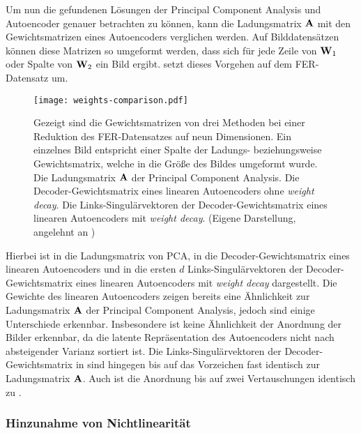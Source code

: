 Um nun die gefundenen Lösungen der Principal Component Analysis und Autoencoder genauer betrachten
zu können, kann die Ladungsmatrix $\mathbf{A}$ mit den Gewichtsmatrizen eines Autoencoders verglichen
werden. Auf Bilddatensätzen können diese Matrizen so umgeformt werden, dass sich für jede Zeile von
$\mathbf{W}_1$ oder Spalte von $\mathbf{W}_2$ ein Bild ergibt.  setzt
dieses Vorgehen auf dem FER-Datensatz um.
\begin{figure}[ht]
	\centering
	\texttt{[image: weights-comparison.pdf]}
	\caption[Die Gewichtsmatrizen von drei Methoden auf dem FER-Datensatz]{Gezeigt sind die Gewichtsmatrizen von drei Methoden bei einer Reduktion des FER-Datensatzes auf neun Dimensionen. Ein einzelnes Bild entspricht einer Spalte der Ladungs- beziehungsweise Gewichtsmatrix, welche in die Größe des Bildes umgeformt wurde. \captiona Die Ladungsmatrix $\mathbf{A}$ der Principal Component Analysis. \captionb Die Decoder-Gewichtsmatrix eines linearen Autoencoders ohne \textit{weight decay}. \captionc Die Links-Singulärvektoren der Decoder-Gewichtsmatrix eines linearen Autoencoders mit \textit{weight decay}. (Eigene Darstellung, angelehnt an \textcite[5]{Plaut.2018})}
	\label{fig:Gewichtsvergleich}
\end{figure}
Hierbei ist in  \captiona die Ladungsmatrix von PCA, in \captionb die Decoder-Gewichtsmatrix eines linearen Autoencoders und in \captionc die ersten $d$ Links-Singulärvektoren der Decoder-Gewichtsmatrix eines linearen Autoencoders mit \textit{weight decay} dargestellt.
Die Gewichte des linearen Autoencoders zeigen bereits eine Ähnlichkeit zur Ladungsmatrix $\mathbf{A}$ der Principal Component Analysis, jedoch sind einige Unterschiede erkennbar. Insbesondere ist keine Ähnlichkeit der Anordnung der Bilder erkennbar, da die latente Repräsentation des Autoencoders nicht nach absteigender Varianz sortiert ist. Die Links-Singulärvektoren der Decoder-Gewichtsmatrix in \captionc sind hingegen bis auf das Vorzeichen fast identisch zur Ladungsmatrix $\mathbf{A}$. Auch ist die Anordnung bis auf zwei Vertauschungen identisch zu \captiona.

\subsubsection{Hinzunahme von Nichtlinearität}


